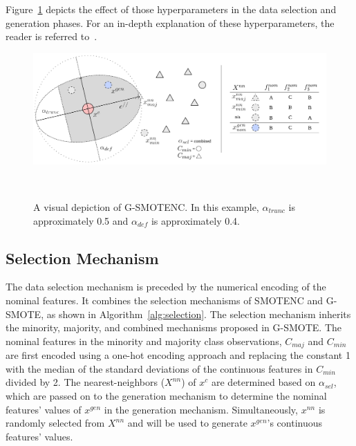 Figure~\ref{fig:gsmote} depicts the effect of those hyperparameters in the
data selection and generation phases. For an in-depth explanation of these
hyperparameters, the reader is referred to~\cite{Douzas2019}.

\begin{figure}
	\centering
	\includegraphics[width=\linewidth]{g-smote}
    \caption[A visual depiction of G-SMOTENC.]{%
        A visual depiction of G-SMOTENC. In this example, $\alpha_{trunc}$ is
        approximately 0.5 and $\alpha_{def}$ is approximately 0.4.
    }~\label{fig:gsmote}
\end{figure}

\subsection{Selection Mechanism}

The data selection mechanism is preceded by the numerical encoding of the
nominal features. It combines the selection mechanisms of SMOTENC and
G-SMOTE, as shown in Algorithm~\ref{alg:selection}. The selection mechanism
inherits the minority, majority, and combined mechanisms proposed in G-SMOTE.
The nominal features in the minority and majority class observations,
$C_{maj}$ and $C_{min}$ are first encoded using a one-hot encoding approach
and replacing the constant 1 with the median of the standard deviations of the
continuous features in $C_{min}$ divided by 2. The nearest-neighbors
($X^{nn}$) of $x^c$ are determined based on $\alpha_{sel}$, which are passed
on to the generation mechanism to determine the nominal features' values of
$x^{gen}$ in the generation mechanism. Simultaneously, $x^{nn}$ is randomly
selected from $X^{nn}$ and will be used to generate $x^{gen}$'s continuous
features' values.


